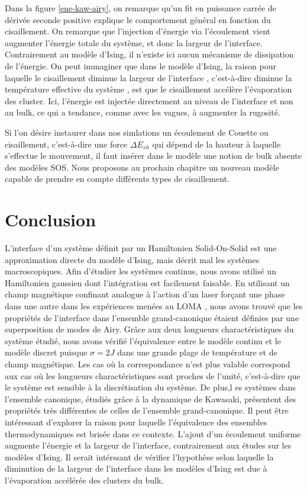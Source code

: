 Dans la figure \ref{ene-kaw-airy}, on remarque qu'un fit en puissance carrée de dérivée seconde positive explique le comportement général en fonction du cisaillement. On remarque que l'injection d'énergie via l'écoulement vient augmenter l'énergie totale du système, et donc la largeur de l'interface. 
Contrairement au modèle d'Ising, il n'existe ici aucun mécanisme de dissipation de l'énergie. On peut immaginer que dans le modèle d'Ising, la raison pour laquelle le cisaillement diminue la largeur de l'interface \cite{smith_interfaces_2008}, c'est-à-dire diminue la température effective du système \cite{cirillo_monte_2005,winter_finite-size_2010}, est que le cisaillement accélère l'évaporation des cluster. 
Ici, l'énergie est injectée directement au niveau de l'interface et non au bulk, ce qui a tendance, comme avec les vagues, à augmenter la rugosité. 

Si l'on désire instaurer dans nos simlations un écoulement de Couette ou cisaillement, c'est-à-dire une force $\Delta E_{sh}$ qui dépend de la hauteur à laquelle s'effectue le mouvement, il faut insérer dans le modèle une notion de bulk absente des modèles SOS. Nous proposons au prochain chapitre un nouveau modèle capable de prendre en compte différents types de cisaillement.

    \section{Conclusion}

L'interface d'un système définit par un Hamiltonien Solid-On-Solid est une approximation directe du modèle d'Ising, mais décrit mal les systèmes macroscopiques. Afin d'étudier les systèmes continus, nous avons utilisé un Hamiltonien gaussien dont l'intégration est facilement faisable. En utilisant un champ magnétique confinant analogue à l'action d'un laser forçant une phase dans une autre dans les expériences menées au LOMA \cite{girot_conical_2019}, nous avons trouvé que les propriétés de l'interface dans l'ensemble grand-canonique étaient définies par une superposition de modes de Airy. Grâce aux deux longueurs charactéristiques du système étudié, nous avons vérifié l'équivalence entre le modèle continu et le modèle discret puisque $\sigma = 2 J$ dans une grande plage de température et de champ magnétique. Les cas où la correspondance n'est plus valable correspond aux cas où les longueurs charactéristiques sont proches de l'unité, c'est-à-dire que le système est sensible à la discrétisation du système. 
De plus,l es systèmes dans l'ensemble canonique, étudiés grâce à la dynamique de Kawasaki, présentent des propriétés très différentes de celles de l'ensemble grand-canonique. Il peut être intéressant d'explorer la raison pour laquelle l'équivalence des ensembles thermodynamiques est brisée dans ce contexte. L'ajout d'un écoulement uniforme augmente l'énergie et la largeur de l'interface, contrairement aux études sur les modèles d'Ising. Il serait intérssant de vérifier l'hypothèse selon laquelle la diminution de la largeur de l'interface dans les modèles d'Ising est due à l'évaporation accélérée des clusters du bulk.


